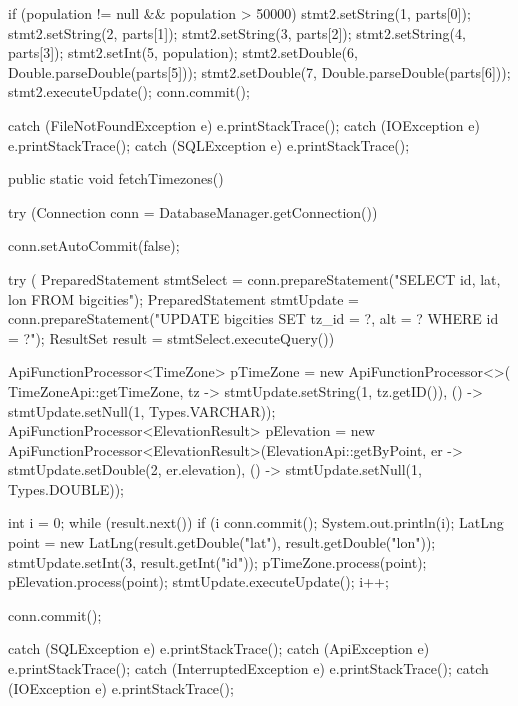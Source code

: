 \begin{javacode}
{{{{{          if (population != null && population > 50000) {
            stmt2.setString(1, parts[0]);
            stmt2.setString(2, parts[1]);
            stmt2.setString(3, parts[2]);
            stmt2.setString(4, parts[3]);
            stmt2.setInt(5, population);
            stmt2.setDouble(6, Double.parseDouble(parts[5]));
            stmt2.setDouble(7, Double.parseDouble(parts[6]));
            stmt2.executeUpdate();
          }
        }
        conn.commit();

      }

    } catch (FileNotFoundException e) {
      e.printStackTrace();
    } catch (IOException e) {
      e.printStackTrace();
    } catch (SQLException e) {
      e.printStackTrace();
    }
  }

  public static void fetchTimezones() {
    try (Connection conn = DatabaseManager.getConnection()) {
      conn.setAutoCommit(false);

      try (
          PreparedStatement stmtSelect =
              conn.prepareStatement("SELECT id, lat, lon FROM bigcities");
          PreparedStatement stmtUpdate =
              conn.prepareStatement("UPDATE bigcities SET tz_id = ?, alt = ? WHERE id = ?");
          ResultSet result = stmtSelect.executeQuery()) {

        ApiFunctionProcessor<TimeZone> pTimeZone = new ApiFunctionProcessor<>(
            TimeZoneApi::getTimeZone, tz -> stmtUpdate.setString(1, tz.getID()),
            () -> stmtUpdate.setNull(1, Types.VARCHAR));
        ApiFunctionProcessor<ElevationResult> pElevation =
            new ApiFunctionProcessor<ElevationResult>(ElevationApi::getByPoint,
                er -> stmtUpdate.setDouble(2, er.elevation),
                () -> stmtUpdate.setNull(1, Types.DOUBLE));

        int i = 0;
        while (result.next()) {
          if (i %
            conn.commit();
            System.out.println(i);
          }
          LatLng point = new LatLng(result.getDouble("lat"), result.getDouble("lon"));
          stmtUpdate.setInt(3, result.getInt("id"));
          pTimeZone.process(point);
          pElevation.process(point);
          stmtUpdate.executeUpdate();
          i++;
        }

        conn.commit();
      }
    } catch (SQLException e) {
      e.printStackTrace();
    } catch (ApiException e) {
      e.printStackTrace();
    } catch (InterruptedException e) {
      e.printStackTrace();
    } catch (IOException e) {
      e.printStackTrace();
    }

}
\end{javacode}
